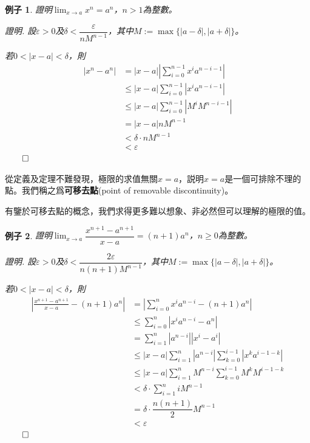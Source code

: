 \documentclass[12pt]{article}
\newtheorem*{example}{例子}
\renewenvironment*{proof}{\textit{證明.}}{\hfill$\qed$}
\begin{document}
    \begin{example}
        證明$\lim_{x\to a}x^n=a^n$，$n>1$為整數。
        
        \begin{proof}
            設$\varepsilon>0$及$\delta<\dfrac{\varepsilon}{nM^{n-1}}$，其中$M:=\max\{|a-\delta|,|a+\delta|\}$。

            若$0<|x-a|<\delta$，則\begin{align*}
                |x^n-a^n|&=|x-a||\sum_{i=0}^{n-1}x^ia^{n-i-1}|\\
                &\leq |x-a|\sum_{i=0}^{n-1}|x^ia^{n-i-1}|\\
                &\leq |x-a|\sum_{i=0}^{n-1}|M^iM^{n-i-1}|\\
                &=|x-a|nM^{n-1}\\
                &<\delta\cdot nM^{n-1}\\
                &<\varepsilon
            \end{align*}
        \end{proof}
    \end{example}

    從定義及定理不難發現，極限的求值無關$x=a$，説明$x=a$是一個可排除不理的點。我們稱之爲\textbf{可移去點}(point of removable discontinuity)。

    有鑒於可移去點的概念，我們求得更多難以想象、非必然但可以理解的極限的值。

    \begin{example}
        證明$\lim_{x\to a}\dfrac{x^{n+1}-a^{n+1}}{x-a}=(n+1)a^n$，$n\geq 0$為整數。
        
        \begin{proof}
            設$\varepsilon>0$及$\delta<\dfrac{2\varepsilon}{n(n+1)M^{n-1}}$，其中$M:=\max\{|a-\delta|,|a+\delta|\}$。

            若$0<|x-a|<\delta$，則\begin{align*}
                |\frac{x^{n+1}-a^{n+1}}{x-a}-(n+1)a^n|&=|\sum_{i=0}^{n}x^ia^{n-i}-(n+1)a^n|\\
                &\leq \sum_{i=0}^{n}|x^ia^{n-i}-a^n|\\
                &=\sum_{i=1}^{n}|a^{n-i}||x^i-a^i|\\
                &\leq |x-a|\sum_{i=1}^{n}|a^{n-i}|\sum_{k=0}^{i-1}|x^ka^{i-1-k}|\\
                &\leq |x-a|\sum_{i=1}^{n}M^{n-i}\sum_{k=0}^{i-1}M^kM^{i-1-k}\\
                &<\delta\cdot \sum_{i=1}^{n}iM^{n-1}\\
                &=\delta\cdot \dfrac{n(n+1)}{2}M^{n-1}\\
                &<\varepsilon
            \end{align*}
        \end{proof}
    \end{example}
\end{document}

